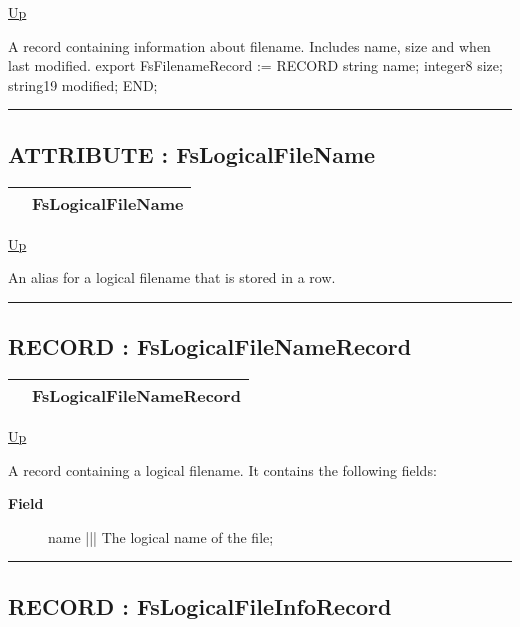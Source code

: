 \hyperlink{ecldoc:File}{Up}

\par
A record containing information about filename. Includes name, size and when last modified. export FsFilenameRecord := RECORD string name; integer8 size; string19 modified; END;


\rule{\textwidth}{0.4pt}
\subsection*{ATTRIBUTE : FsLogicalFileName}
\hypertarget{ecldoc:file.fslogicalfilename}{}

{\renewcommand{\arraystretch}{1.5}
\begin{tabularx}{\textwidth}{|>{\raggedright\arraybackslash}l|X|}
\hline
\hspace{0pt} & FsLogicalFileName \\
\hline
\end{tabularx}
}

\hyperlink{ecldoc:File}{Up}

\par
An alias for a logical filename that is stored in a row.


\rule{\textwidth}{0.4pt}
\subsection*{RECORD : FsLogicalFileNameRecord}
\hypertarget{ecldoc:file.fslogicalfilenamerecord}{}

{\renewcommand{\arraystretch}{1.5}
\begin{tabularx}{\textwidth}{|>{\raggedright\arraybackslash}l|X|}
\hline
\hspace{0pt} & FsLogicalFileNameRecord \\
\hline
\end{tabularx}
}

\hyperlink{ecldoc:File}{Up}

\par
A record containing a logical filename. It contains the following fields:

\par
\begin{description}
\item [\textbf{Field}] name ||| The logical name of the file;
\end{description}

\rule{\textwidth}{0.4pt}
\subsection*{RECORD : FsLogicalFileInfoRecord}
\hypertarget{ecldoc:file.fslogicalfileinforecord}{}

